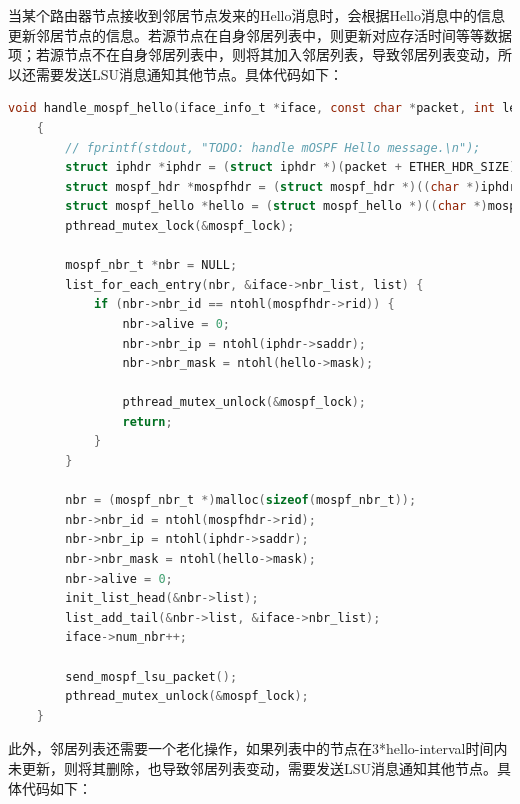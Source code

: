 \documentclass[UTF8]{report}
\begin{document}
当某个路由器节点接收到邻居节点发来的Hello消息时，会根据Hello消息中的信息更新邻居节点的信息。若源节点在自身邻居列表中，则更新对应存活时间等等数据项；若源节点不在自身邻居列表中，则将其加入邻居列表，导致邻居列表变动，所以还需要发送LSU消息通知其他节点。具体代码如下：

\begin{lstlisting}[language=C]
    void handle_mospf_hello(iface_info_t *iface, const char *packet, int len)
    {
        // fprintf(stdout, "TODO: handle mOSPF Hello message.\n");
        struct iphdr *iphdr = (struct iphdr *)(packet + ETHER_HDR_SIZE);
        struct mospf_hdr *mospfhdr = (struct mospf_hdr *)((char *)iphdr + IP_HDR_SIZE(iphdr));
        struct mospf_hello *hello = (struct mospf_hello *)((char *)mospfhdr + MOSPF_HDR_SIZE);
        pthread_mutex_lock(&mospf_lock);
    
        mospf_nbr_t *nbr = NULL;
        list_for_each_entry(nbr, &iface->nbr_list, list) {
            if (nbr->nbr_id == ntohl(mospfhdr->rid)) {
                nbr->alive = 0;
                nbr->nbr_ip = ntohl(iphdr->saddr);
                nbr->nbr_mask = ntohl(hello->mask);
    
                pthread_mutex_unlock(&mospf_lock);
                return;
            }
        }
    
        nbr = (mospf_nbr_t *)malloc(sizeof(mospf_nbr_t));
        nbr->nbr_id = ntohl(mospfhdr->rid);
        nbr->nbr_ip = ntohl(iphdr->saddr);
        nbr->nbr_mask = ntohl(hello->mask);
        nbr->alive = 0;
        init_list_head(&nbr->list);
        list_add_tail(&nbr->list, &iface->nbr_list);
        iface->num_nbr++;
    
        send_mospf_lsu_packet();
        pthread_mutex_unlock(&mospf_lock);
    }
\end{lstlisting}

此外，邻居列表还需要一个老化操作，如果列表中的节点在3*hello-interval时间内未更新，则将其删除，也导致邻居列表变动，需要发送LSU消息通知其他节点。具体代码如下：
\end{document}
